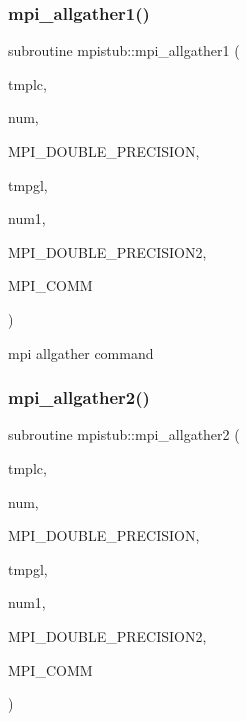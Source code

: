 \subsubsection{\texorpdfstring{mpi\_allgather1()}{mpi\_allgather1()}}
{\footnotesize\ttfamily subroutine mpistub\+::mpi\+\_\+allgather1 (\begin{DoxyParamCaption}\item[{double precision, dimension(\+:)}]{tmplc,  }\item[{}]{num,  }\item[{}]{M\+P\+I\+\_\+\+D\+O\+U\+B\+L\+E\+\_\+\+P\+R\+E\+C\+I\+S\+I\+ON,  }\item[{double precision, dimension(\+:)}]{tmpgl,  }\item[{}]{num1,  }\item[{}]{M\+P\+I\+\_\+\+D\+O\+U\+B\+L\+E\+\_\+\+P\+R\+E\+C\+I\+S\+I\+O\+N2,  }\item[{}]{M\+P\+I\+\_\+\+C\+O\+MM }\end{DoxyParamCaption})}



mpi allgather command 

\mbox{\label{namespacempistub_a4af9ae68605228fa295ff15192cad31c}} 
\subsubsection{\texorpdfstring{mpi\_allgather2()}{mpi\_allgather2()}}
{\footnotesize\ttfamily subroutine mpistub\+::mpi\+\_\+allgather2 (\begin{DoxyParamCaption}\item[{double precision}]{tmplc,  }\item[{}]{num,  }\item[{}]{M\+P\+I\+\_\+\+D\+O\+U\+B\+L\+E\+\_\+\+P\+R\+E\+C\+I\+S\+I\+ON,  }\item[{double precision, dimension(\+:)}]{tmpgl,  }\item[{}]{num1,  }\item[{}]{M\+P\+I\+\_\+\+D\+O\+U\+B\+L\+E\+\_\+\+P\+R\+E\+C\+I\+S\+I\+O\+N2,  }\item[{}]{M\+P\+I\+\_\+\+C\+O\+MM }\end{DoxyParamCaption})}

\mbox{\label{namespacempistub_a60f773685d2ab6f25d3d674acd53d941}} 
